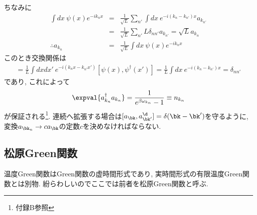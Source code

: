 \documentclass[10.5pt,a4paper]{jreport}
\begin{document}
ちなみに
\begin{eqnarray}
  \int dx\ \psi(x)e^{-ik_nx} &=& \frac{1}{\sqrt{L}}\sum_{n'}\int dx\ e^{-i(k_n-k_{n'})x}a_{k_{n'}}\\
  &=& \frac{1}{\sqrt{L}}\sum_{n'}L\delta_{nn'}a_{k_{n'}} = \sqrt{L}a_{k_n}\\
  \therefore a_{k_n} &=& \frac{1}{\sqrt{L}}\int dx\ \psi(x)e^{-ik_nx}  
\end{eqnarray}
このとき交換関係は
\begin{eqnarray}
  [a_{k_n}, a^\dagger_{k_{n'}}] = \frac{1}{L}\int dx dx'\ e^{-i(k_nx - k_{n'}x')}\left[\psi(x), \psi^\dagger(x')\right] = \frac{1}{L}\int dx \ e^{-i(k_n - k_{n'})x} = \delta_{nn'}
\end{eqnarray}
であり, これによって
\begin{eqnarray}
  \expval{a_{k_n}^\dagger a_{k_n}} = \frac{1}{e^{\beta\omega_{k_n}}-1} \equiv n_{k_n}
\end{eqnarray}
が保証される\footnote{付録B参照}. 連続へ拡張する場合は$[a_{\bk}, a^\d_{\bk'}] = \delta(\bk - \bk')$を守るように, 変換$a_{\bk_n}\rightarrow ca_{\bk}$の定数$c$を決めなければならない. 
\subsection{松原Green関数}
温度Green関数はGreen関数の虚時間形式であり, 実時間形式の有限温度Green関数とは別物. 紛らわしいのでここでは前者を松原Green関数と呼ぶ.
\end{document}
